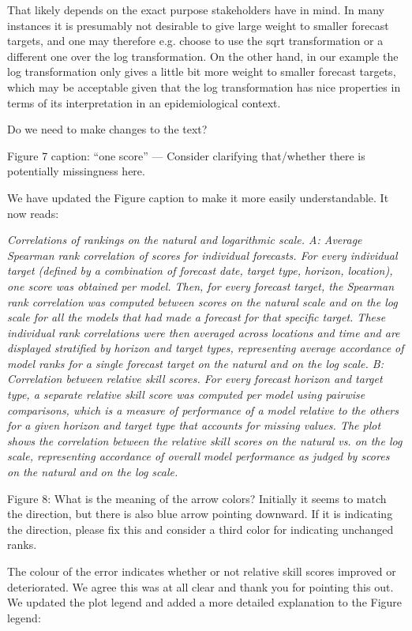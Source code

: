 \documentclass{article}
\newcommand{\black}{\color{black}}
\newcommand{\blue}{\color{blue}}
\begin{document}
\black
That likely depends on the exact purpose stakeholders have in mind. In many instances it is presumably not desirable to give large weight to smaller forecast targets, and one may therefore e.g. choose to use the sqrt transformation or a different one over the log transformation. On the other hand, in our example the log transformation only gives a little bit more weight to smaller forecast targets, which may be acceptable given that the log transformation has nice properties in terms of its interpretation in an epidemiological context. 

Do we need to make changes to the text? 

\blue
Figure 7 caption: “one score” — Consider clarifying that/whether there is potentially missingness here.

\black
We have updated the Figure caption to make it more easily understandable. It now reads: 

\textit{Correlations of rankings on the natural and logarithmic scale. A: Average Spearman rank correlation of scores for individual forecasts. For every individual target (defined by a combination of forecast date, target type, horizon, location), one score was obtained per model. Then, for every forecast target, the Spearman rank correlation was computed between scores on the natural scale and on the log scale for all the models that had made a forecast for that specific target. These individual rank correlations were then averaged across locations and time and are displayed stratified by horizon and target types, representing average accordance of model ranks for a single forecast target on the natural and on the log scale. B: Correlation between relative skill scores. For every forecast horizon and target type, a separate relative skill score was computed per model using pairwise comparisons, which is a measure of performance of a model relative to the others for a given horizon and target type that accounts for missing values. The plot shows the correlation between the relative skill scores on the natural vs. on the log scale, representing accordance of overall model performance as judged by scores on the natural and on the log scale.}


\blue
Figure 8: What is the meaning of the arrow colors? Initially it seems to match the direction, but there is also blue arrow pointing downward. If it is indicating the direction, please fix this and consider a third color for indicating unchanged ranks.

\black
The colour of the error indicates whether or not relative skill scores improved or deteriorated. We agree this was at all clear and thank you for pointing this out. We updated the plot legend and added a more detailed explanation to the Figure legend: 
\end{document}
